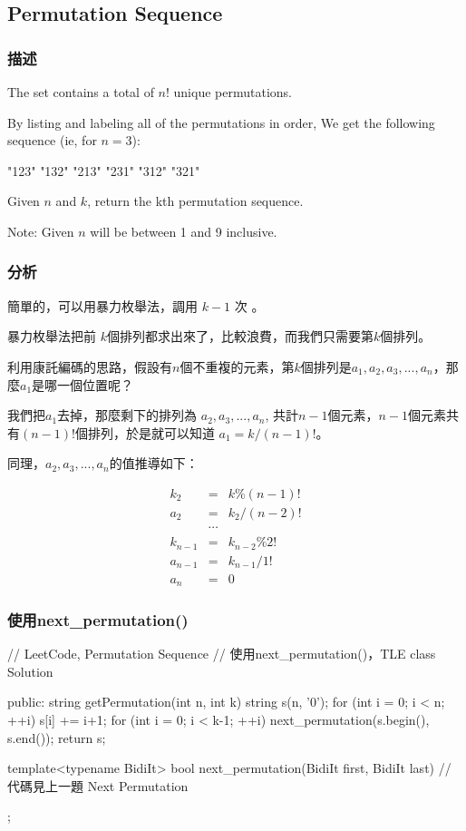 \subsection{Permutation Sequence} %
\label{sec:permutation-sequence}


\subsubsection{描述}
The set \fn{[1,2,3,…,n]} contains a total of $n!$ unique permutations.

By listing and labeling all of the permutations in order,
We get the following sequence (ie, for $n = 3$):
\begin{Code}
"123"
"132"
"213"
"231"
"312"
"321"
\end{Code}

Given $n$ and $k$, return the kth permutation sequence.

Note: Given $n$ will be between 1 and 9 inclusive.


\subsubsection{分析}
簡單的，可以用暴力枚舉法，調用 $k-1$ 次 。

暴力枚舉法把前 $k$個排列都求出來了，比較浪費，而我們只需要第$k$個排列。

利用康託編碼的思路，假設有$n$個不重複的元素，第$k$個排列是$a_1, a_2, a_3, ..., a_n$，那麼$a_1$是哪一個位置呢？

我們把$a_1$去掉，那麼剩下的排列為
$a_2, a_3, ..., a_n$, 共計$n-1$個元素，$n-1$個元素共有$(n-1)!$個排列，於是就可以知道 $a_1 = k / (n-1)!$。

同理，$a_2, a_3, ..., a_n$的值推導如下：

\begin{eqnarray}
k_2 &=& k\%(n-1)! \nonumber \\
a_2 &=& k_2/(n-2)! \nonumber \\
\quad & \cdots \nonumber \\
k_{n-1} &=& k_{n-2}\%2! \nonumber \\
a_{n-1} &=& k_{n-1}/1! \nonumber \\
a_n &=& 0 \nonumber
\end{eqnarray}


\subsubsection{使用next_permutation()}
\begin{Code}
// LeetCode, Permutation Sequence
// 使用next_permutation()，TLE
class Solution {
public:
    string getPermutation(int n, int k) {
        string s(n, '0');
        for (int i = 0; i < n; ++i)
            s[i] += i+1;
        for (int i = 0; i < k-1; ++i)
            next_permutation(s.begin(), s.end());
        return s;
    }

    template<typename BidiIt>
    bool next_permutation(BidiIt first, BidiIt last) {
        // 代碼見上一題 Next Permutation
    }
};
\end{Code}


